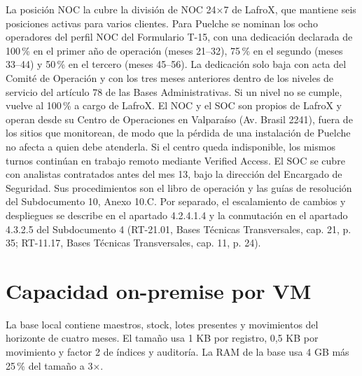 La posición NOC la cubre la división de NOC 24×7 de LafroX, que mantiene seis posiciones activas para varios clientes. Para Puelche se nominan los ocho operadores del perfil NOC del Formulario T-15, con una dedicación declarada de 100\,\% en el primer año de operación (meses 21--32), 75\,\% en el segundo (meses 33--44) y 50\,\% en el tercero (meses 45--56). La dedicación solo baja con acta del Comité de Operación y con los tres meses anteriores dentro de los niveles de servicio del artículo 78 de las Bases Administrativas. Si un nivel no se cumple, vuelve al 100\,\% a cargo de LafroX. El NOC y el SOC son propios de LafroX y operan desde su Centro de Operaciones en Valparaíso (Av. Brasil 2241), fuera de los sitios que monitorean, de modo que la pérdida de una instalación de Puelche no afecta a quien debe atenderla. Si el centro queda indisponible, los mismos turnos continúan en trabajo remoto mediante Verified Access. El SOC se cubre con analistas contratados antes del mes 13, bajo la dirección del Encargado de Seguridad. Sus procedimientos son el libro de operación y las guías de resolución del Subdocumento 10, Anexo 10.C. Por separado, el escalamiento de cambios y despliegues se describe en el apartado 4.2.4.1.4 y la conmutación en el apartado 4.3.2.5 del Subdocumento 4 (RT-21.01, Bases Técnicas Transversales, cap. 21, p. 35; RT-11.17, Bases Técnicas Transversales, cap. 11, p. 24).

\section{Capacidad on-premise por VM}
\label{sec:anexo-4b-onpremise}

La base local contiene maestros, stock, lotes presentes y movimientos del horizonte de cuatro meses. El tamaño usa 1 KB por registro, 0,5 KB por movimiento y factor 2 de índices y auditoría. La RAM de la base usa 4 GB más 25\,\% del tamaño a 3×.

